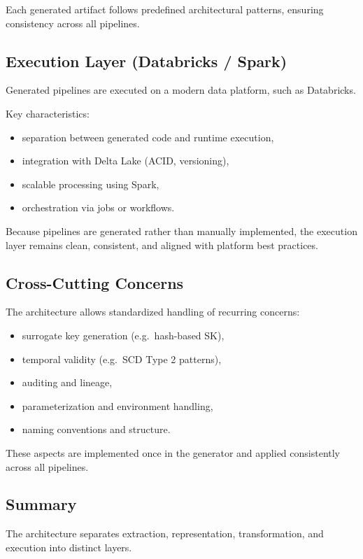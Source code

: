 \documentclass[11pt,a4paper]{article}
\begin{document}
Each generated artifact follows predefined architectural patterns, ensuring consistency across all pipelines.

\subsection{Execution Layer (Databricks / Spark)}

Generated pipelines are executed on a modern data platform, such as Databricks.

Key characteristics:
\begin{itemize}
  \item separation between generated code and runtime execution,
  \item integration with Delta Lake (ACID, versioning),
  \item scalable processing using Spark,
  \item orchestration via jobs or workflows.
\end{itemize}

Because pipelines are generated rather than manually implemented, the execution layer remains clean, consistent, and aligned with platform best practices.

\subsection{Cross-Cutting Concerns}

The architecture allows standardized handling of recurring concerns:
\begin{itemize}
  \item surrogate key generation (e.g.\ hash-based SK),
  \item temporal validity (e.g.\ SCD Type 2 patterns),
  \item auditing and lineage,
  \item parameterization and environment handling,
  \item naming conventions and structure.
\end{itemize}

These aspects are implemented once in the generator and applied consistently across all pipelines.

\subsection{Summary}

The architecture separates extraction, representation, transformation, and execution into distinct layers.
\end{document}
